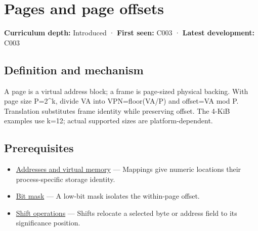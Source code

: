 \hypertarget{appendix-0c67cd5bf30a}{}\label{referencestart:appendix-0c67cd5bf30a}
\section{Pages and page offsets}\label{appendix-0c67cd5bf30a-pages-and-page-offsets}

\hypertarget{appendix-0c67cd5bf30a-pages-and-page-offsets}{}

\textbf{Curriculum depth:} Introduced · \textbf{First seen:} C003 · \textbf{Latest development:} C003

\begin{allmightroledefinition}

\subsection{Definition and mechanism}\label{appendix-0c67cd5bf30a-definition-and-mechanism}

\hypertarget{appendix-0c67cd5bf30a-definition-and-mechanism}{}

A page is a virtual address block; a frame is page-sized physical backing. With page size P=2\^{}k, divide VA into VPN=floor(VA/P) and offset=VA mod P. Translation substitutes frame identity while preserving offset. The 4-KiB examples use k=12; actual supported sizes are platform-dependent.

\end{allmightroledefinition}

\subsection{Prerequisites}\label{appendix-0c67cd5bf30a-prerequisites}

\hypertarget{appendix-0c67cd5bf30a-prerequisites}{}

\begin{itemize}
\tightlist
\item
  \hyperref[appendix-18ee4f913c3c]{Addresses and virtual memory} --- Mappings give numeric locations their process-specific storage identity.
\item
  \hyperref[appendix-dbe5905163c2]{Bit mask} --- A low-bit mask isolates the within-page offset.
\item
  \hyperref[appendix-73425b25118e]{Shift operations} --- Shifts relocate a selected byte or address field to its significance position.
\end{itemize}

